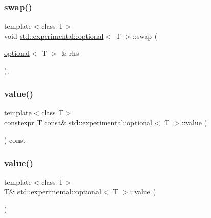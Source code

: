 \subsubsection{\texorpdfstring{swap()}{swap()}}
{\footnotesize\ttfamily template$<$class T$>$ \\
void \hyperlink{classstd_1_1experimental_1_1optional}{std\+::experimental\+::optional}$<$ T $>$\+::swap (\begin{DoxyParamCaption}\item[{\hyperlink{classstd_1_1experimental_1_1optional}{optional}$<$ T $>$ \&}]{rhs }\end{DoxyParamCaption})\hspace{0.3cm}{\ttfamily [inline]}, {\ttfamily [noexcept]}}

\mbox{\label{classstd_1_1experimental_1_1optional_ad1277f09c288255dfe102b72e7107be6}} 
\subsubsection{\texorpdfstring{value()}{value()}\hspace{0.1cm}{\footnotesize\ttfamily [1/2]}}
{\footnotesize\ttfamily template$<$class T$>$ \\
constexpr T const\& \hyperlink{classstd_1_1experimental_1_1optional}{std\+::experimental\+::optional}$<$ T $>$\+::value (\begin{DoxyParamCaption}{ }\end{DoxyParamCaption}) const\hspace{0.3cm}{\ttfamily [inline]}}

\mbox{\label{classstd_1_1experimental_1_1optional_a2278733d39a8c6b6c032f080b5ca0644}} 
\subsubsection{\texorpdfstring{value()}{value()}\hspace{0.1cm}{\footnotesize\ttfamily [2/2]}}
{\footnotesize\ttfamily template$<$class T$>$ \\
T\& \hyperlink{classstd_1_1experimental_1_1optional}{std\+::experimental\+::optional}$<$ T $>$\+::value (\begin{DoxyParamCaption}{ }\end{DoxyParamCaption})\hspace{0.3cm}{\ttfamily [inline]}}

